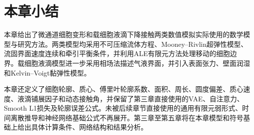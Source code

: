 \section{本章小结}

本章给出了微通道细胞变形和载细胞液滴下降接触两类数值模拟实际使用的数学模型与研究方法。两类模型均采用不可压缩流体方程、Mooney--Rivlin超弹性模型、流固界面速度连续和牵引平衡条件，并利用ALE有限元方法处理移动的细胞边界。载细胞液滴模型进一步采用相场法描述气液界面，并引入表面张力、壁面润湿和Kelvin--Voigt黏弹性模型。

本章还定义了细胞轮廓、质心、傅里叶轮廓系数、面积、周长、圆度偏差、质心速度、液滴铺展因子和动态接触角，并保留了第三章直接使用的VAE、自注意力、Smooth L1损失及轮廓误差公式。未被后续章节直接使用的通用有限元弱形式、时间离散推导和神经网络基础公式不再展开。第三章至第五章将在本章模型和符号基础上给出具体计算条件、网络结构和结果分析。

